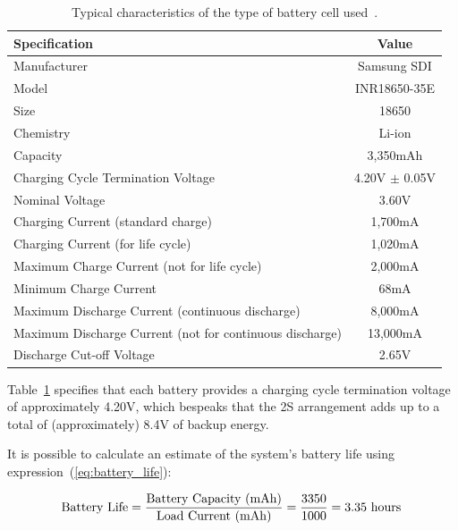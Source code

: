 \begingroup
\begin{table}[h]
	\caption{Typical characteristics of the type of battery cell used~\cite{INR18650-35E}.}
	\label{tab:battery2S}
	\centering%
	\begin{tabular}{lc}
        \toprule
        \textbf{Specification} & \textbf{Value} \\
        \midrule
        Manufacturer & Samsung SDI \\
        \midrule
        Model & INR18650-35E \\
        \midrule
		Size & 18650 \\
		\midrule
		Chemistry & Li-ion \\
		\midrule
		Capacity & 3,350mAh \\
        \midrule
		Charging Cycle Termination Voltage & 4.20V $\pm$ 0.05V \\
		\midrule
		Nominal Voltage & 3.60V \\
        \midrule
		Charging Current (standard charge) & 1,700mA\\
		\midrule
		Charging Current (for life cycle) & 1,020mA\\
		\midrule
		Maximum Charge Current (not for life cycle) & 2,000mA \\
		\midrule
		Minimum Charge Current & 68mA \\
		\midrule
		Maximum Discharge Current (continuous discharge) & 8,000mA \\
		\midrule
		Maximum Discharge Current (not for continuous discharge) & 13,000mA \\
		\midrule
		Discharge Cut-off Voltage & 2.65V \\
        \bottomrule
    \end{tabular}
\end{table}
\endgroup

Table~\ref{tab:battery2S} specifies that each battery provides a charging cycle termination voltage of approximately 4.20V, which bespeaks that the 2S arrangement adds up to a total of (approximately) 8.4V of backup energy.

It is possible to calculate an estimate of the system's battery life using expression~(\ref{eq:battery_life}):

\begin{equation}\label{eq:battery_life}
    \textrm{Battery Life} = \frac{\textrm{Battery Capacity (mAh)}}{\textrm{Load Current (mAh)}} = \frac{3350}{1000} = 3.35 \textrm{ hours}\,\medskip
\end{equation}

